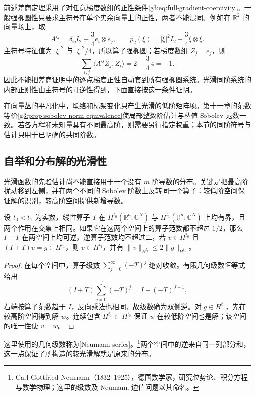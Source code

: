 前述差商定理采用了对任意梯度数组的正性条件\eqref{g3:eq:full-gradient-coercivity}。一般强椭圆性只要求主符号在单个实余向量上的正性，两者不能混同。例如在 \(\mathbb R^2\) 的向量场上，取
\[
	A^{ij}=\delta_{ij}I_2-\frac34 e_i\otimes e_j,
	\qquad
	p_2(\xi)=|\xi|^2I_2-\frac34\xi\otimes\xi.
\]
主符号特征值为 \( |\xi|^2\) 与 \( |\xi|^2/4\)，所以算子强椭圆；若梯度数组 \(Z_j=e_j\)，则
\[
	\sum_{i,j}\langle A^{ij}Z_j,Z_i\rangle=2-\frac34\,4=-1.
\]
因此不能把差商证明中的逐点梯度正性自动套到所有强椭圆系统。光滑同阶系统的内部正则性由主符号的可逆性得到，下面直接按这一条件证明。

\ProseParagraphBreak

在向量丛的平凡化中，联络和标架变化只产生光滑的低阶矩阵项。第十一章的范数等价\cref{g3:prop:sobolev-norm-equivalence}使局部整数阶估计与丛值 Sobolev 范数一致。若各方程和未知量具有不同最高阶，则需要另行指定权重；本节的同阶符号与估计只用于已明确的共同阶数。

\subsection{自举和分布解的光滑性}
\label{g3:subsec:1203:05}
光滑函数的先验估计尚不能直接用于一个没有 \(m\) 阶导数的分布。关键是把最高阶扰动移到左侧，并在两个不同的 Sobolev 阶数上反转同一个算子：较低阶空间保证解的识别，较高阶空间提供新增导数。

\begin{lemma}\label{g3:lem:two-scale-inverse}
	设 \(t_0<t_1\) 为实数，线性算子 \(T\) 在 \(H^{t_0}(\mathbb R^n;\mathbb C^N)\) 与 \(H^{t_1}(\mathbb R^n;\mathbb C^N)\) 上均有界，且两个作用在交集上相同。如果它在这两个空间上的算子范数都不超过 \(1/2\)，那么 \(I+T\) 在两空间上均可逆，逆算子范数均不超过二。若 \(v\in H^{t_0}\) 且 \((I+T)v=g\in H^{t_1}\)，则 \(v\in H^{t_1}\)，并有 \(\|v\|_{H^{t_1}}\le2\|g\|_{H^{t_1}}\)。
\end{lemma}
\begin{proof}
	在每个空间中，算子级数 \(\sum_{j=0}^\infty(-T)^j\) 绝对收敛。有限几何级数恒等式给出
	\[
		(I+T)\sum_{j=0}^{J}(-T)^j=I-(-T)^{J+1},
	\]
	右端按算子范数趋于 \(I\)，反向乘法也相同，故级数确为双侧逆。对 \(g\in H^{t_1}\)，先在较高阶空间得到解 \(w\)。连续包含 \(H^{t_1}\subset H^{t_0}\) 保证 \(w\) 在较低阶空间也是解；该空间的唯一性使 \(v=w\)。
\end{proof}

这里使用的几何级数称为[Neumann series]。\footnote{Carl Gottfried Neumann（1832--1925），德国数学家，研究位势论、积分方程与数学物理；这里的级数及 Neumann 边值问题以其命名。}两个空间中的逆来自同一列部分和，这一点保证了所构造的较光滑解就是原来的分布。

